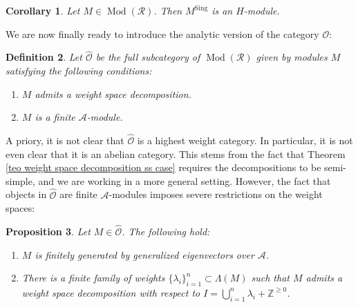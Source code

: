 \documentclass{amsart}
\newtheorem{defi}{ Definition}[subsection]
\newtheorem{prop}[defi]{ Proposition}
\newtheorem{coro}[defi]{Corollary}
\newcommand{\Mod}{\operatorname{Mod}}
\newcommand{\OX}{\mathcal{O}}
\begin{document}
\begin{coro}
Let $M\in \Mod(\mathscr{R})$. Then $M^{\operatorname{Sing}}$  is an $H$-module.   
\end{coro}
We are now finally ready to introduce the analytic version of the category $\OX$:
\begin{defi}
Let $\widehat{\OX}$ be the full subcategory of $\Mod(\mathscr{R})$ given by modules $M$  satisfying the following conditions:
\begin{enumerate}[label=(\roman*)]
    \item $M$ admits a  weight space decomposition.
    \item $M$ is a finite $\mathscr{A}$-module.
\end{enumerate}
\end{defi}
A priory, it is not clear that $\widehat{\OX}$ is a highest weight category. In particular, it is not even clear that it is an abelian category. This stems from the fact that Theorem \ref{teo weight space decomposition ss case} requires the decompositions to be semi-simple, and we are working in a more general setting. However, the fact that objects in $\widehat{\OX}$ are finite $\mathscr{A}$-modules imposes severe restrictions on the weight spaces: 
\begin{prop}\label{prop generating system by eigenvectors}
Let $M\in\widehat{\OX}$. The following hold:
\begin{enumerate}[label=(\roman*)]
    \item $M$ is finitely generated by generalized eigenvectors over $\mathscr{A}$.
    \item There is a finite family  of weights $\{\lambda_i\}_{i=1}^n\subset \Lambda(M)$  such that $M$ admits a weight space decomposition with respect to $I=\bigcup_{i=1}^n\lambda_i+\mathbb{Z}^{\geq 0}$. 
\end{enumerate}
\end{prop}
\end{document}
